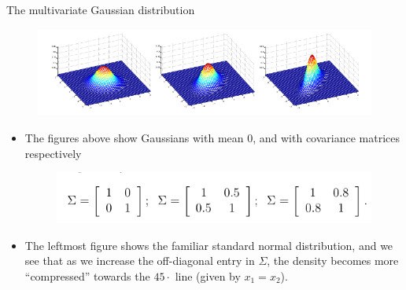 \documentclass[handout]{beamer}
\begin{document}
\begin{frame}[fragile]{The multivariate Gaussian distribution}
\scriptsize{


  
  \begin{figure}[h!]
	\centering
	\includegraphics[scale=0.4]{pics/mgaussian2.png}
\end{figure}
 
\begin{itemize}
 

 \item The figures above show Gaussians with mean 0, and with covariance matrices respectively
 
   \begin{figure}[h!]
	\centering
	\includegraphics[scale=0.35]{pics/mgaussian4.png}
\end{figure}

\item The leftmost figure shows the familiar standard normal distribution, and we see that as we increase the off-diagonal entry in $\Sigma$, the density becomes more ``compressed'' towards the $45\cdot$ line (given by $x_1 = x_2$).
 
\end{itemize}
 

 
}
\end{frame}
\end{document}
